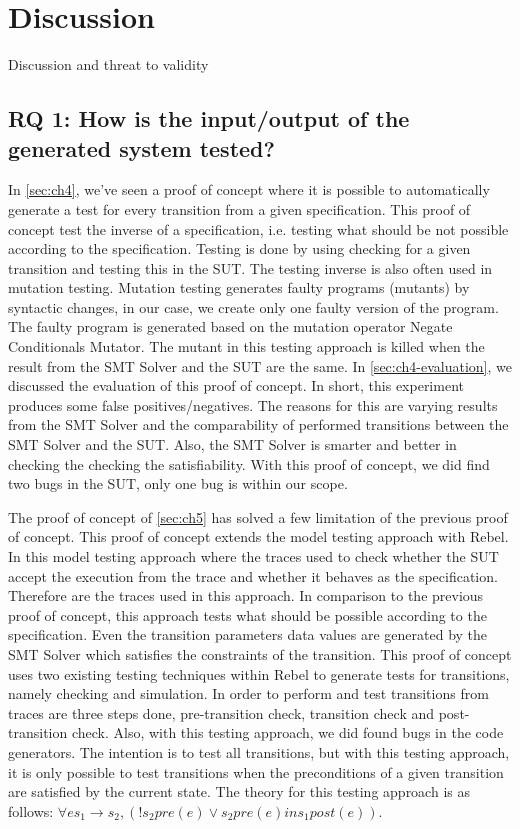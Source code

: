 \chapter{Discussion}

Discussion and threat to validity

\section{RQ 1: How is the input/output of the generated system tested?}

In \autoref{sec:ch4}, we've seen a proof of concept where it is possible to automatically generate a test for every transition from a given specification. This proof of concept test the inverse of a specification, i.e. testing what should be not possible according to the specification. Testing is done by using checking for a given transition and testing this in the SUT. The testing inverse is also often used in mutation testing. Mutation testing generates faulty programs (mutants) by syntactic changes, in our case, we create only one faulty version of the program. The faulty program is generated based on the mutation operator Negate Conditionals Mutator. The mutant in this testing approach is killed when the result from the SMT Solver and the SUT are the same. In \autoref{sec:ch4-evaluation}, we discussed the evaluation of this proof of concept. In short, this experiment produces some false positives/negatives. The reasons for this are varying results from the SMT Solver and the comparability of performed transitions between the SMT Solver and the SUT. Also, the SMT Solver is smarter and better in checking the checking the satisfiability. With this proof of concept, we did find two bugs in the SUT, only one bug is within our scope. 

The proof of concept of \autoref{sec:ch5} has solved a few limitation of the previous proof of concept. This proof of concept extends the model testing approach with Rebel. In this model testing approach where the traces used to check whether the SUT accept the execution from the trace and whether it behaves as the specification. Therefore are the traces used in this approach. In comparison to the previous proof of concept, this approach tests what should be possible according to the specification. Even the transition parameters data values are generated by the SMT Solver which satisfies the constraints of the transition. This proof of concept uses two existing testing techniques within Rebel to generate tests for transitions, namely checking and simulation. In order to perform and test transitions from traces are three steps done, pre-transition check, transition check and post-transition check. Also, with this testing approach, we did found bugs in the code generators. The intention is to test all transitions, but with this testing approach, it is only possible to test transitions when the preconditions of a given transition are satisfied by the current state. The theory for this testing approach is as follows: $\forall e s_{1} \to s_{2}, (! s_{2} pre(e) \lor s_{2} pre(e) in s_{1} post(e))$.


